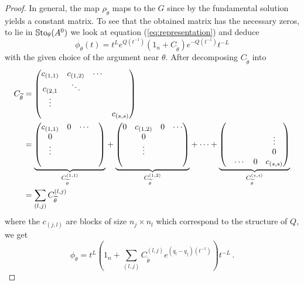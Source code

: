 \begin{proof}
  In general, the map $\rho_{\tilde\theta}$ maps to the $G$ since
   by the fundamental solution yields a constant matrix.
  To see that the obtained matrix has the necessary zeros, to lie in
  $\operatorname{\mathbb{S}to}_{\theta}(A^0)$ we look at equation (\ref{eq:representation}) and
  deduce
  \[
    \phi_\theta(t)
    =t^L e^{Q(t^{-1})}(1_n+C_{\tilde\theta})e^{-Q(t^{-1})}t^{-L}
  \]
  with the given choice of the argument near $\theta$.
  After decomposing $C_{\tilde\theta}$ into
  \begin{align*}
    C_{\tilde\theta}&=\begin{pmatrix}
      c_{(1,1)} & c_{(1,2)} & \cdots &\\
      c_{(2,1} & \ddots\\
      \vdots \\
      & & & c_{(s,s)}
    \end{pmatrix}
  \\&=
    \underset{C_{\tilde\theta}^{(1,1)}}{\underbrace{%
      \begin{pmatrix}
        c_{(1,1)} & 0 & \cdots &\\
        0\\
        \vdots&\\
        &
      \end{pmatrix}
    }}
    +
    \underset{C_{\tilde\theta}^{(1,2)}}{\underbrace{%
      \begin{pmatrix}
        0 & c_{(1,2)} & 0 & \cdots\\
        & 0 &\\
        &\vdots\\
        &
      \end{pmatrix}
    }}
    +\cdots+
    \underset{C_{\tilde\theta}^{(s,s)}}{\underbrace{%
      \begin{pmatrix}
        &\\
        & & & \vdots\\
        & & & 0\\
        & \cdots & 0 & c_{(s,s)}
      \end{pmatrix}
    }}
  \\&=\sum_{(l,j)}C_{\tilde\theta}^{(l,j)}
  \end{align*}
  where the $c_{(j,l)}$ are blocks of size $n_j\times n_l$ which correspond to
  the structure of $Q$, we get
  \[
    \phi_\theta=
      t^L\left(
        1_n+\sum_{(l,j)}C_{\tilde\theta}^{(l,j)}e^{(q_l-q_j)(t^{-1})}
      \right)t^{-L} \,.
  \]
  \begin{comment}

\end{comment}
\end{proof}
